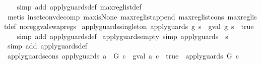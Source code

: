 \begin{isabellebody}
%
\isadelimproof
\ \ %
\endisadelimproof
%
\isatagproof
{}\isamarkupfalse%
\ {\isacharparenleft}simp\ add{\isacharcolon}\ apply{\isacharunderscore}guards{\isacharunderscore}def\ max{\isacharunderscore}reg{\isacharunderscore}list{\isacharunderscore}def{\isacharparenright}\isanewline
\ \ \isamarkupfalse%
\ {\isacharparenleft}metis\ in{\isacharunderscore}set{\isacharunderscore}conv{\isacharunderscore}decomp\ max{\isacharunderscore}is{\isacharunderscore}None\ max{\isacharunderscore}reg{\isacharunderscore}list{\isacharunderscore}append\ max{\isacharunderscore}reg{\isacharunderscore}list{\isacharunderscore}cons\ max{\isacharunderscore}reg{\isacharunderscore}list{\isacharunderscore}def\ no{\isacharunderscore}reg{\isacharunderscore}gval{\isacharunderscore}swap{\isacharunderscore}regs{\isacharparenright}%
\endisatagproof
{\isafoldproof}%
%
\isadelimproof
\isanewline
%
\endisadelimproof
\isanewline
{}\isamarkupfalse%
\ apply{\isacharunderscore}guards{\isacharunderscore}singleton{\isacharcolon}\ {\isachardoublequoteopen}{\isacharparenleft}apply{\isacharunderscore}guards\ {\isacharbrackleft}g{\isacharbrackright}\ s{\isacharparenright}\ {\isacharequal}\ {\isacharparenleft}gval\ g\ s\ {\isacharequal}\ true{\isacharparenright}{\isachardoublequoteclose}\isanewline
%
\isadelimproof
\ \ %
\endisadelimproof
%
\isatagproof
{}\isamarkupfalse%
\ {\isacharparenleft}simp\ add{\isacharcolon}\ apply{\isacharunderscore}guards{\isacharunderscore}def{\isacharparenright}%
\endisatagproof
{\isafoldproof}%
%
\isadelimproof
\isanewline
%
\endisadelimproof
\isanewline
{}\isamarkupfalse%
\ apply{\isacharunderscore}guards{\isacharunderscore}empty\ {\isacharbrackleft}simp{\isacharbrackright}{\isacharcolon}\ {\isachardoublequoteopen}apply{\isacharunderscore}guards\ {\isacharbrackleft}{\isacharbrackright}\ s{\isachardoublequoteclose}\isanewline
%
\isadelimproof
\ \ %
\endisadelimproof
%
\isatagproof
{}\isamarkupfalse%
\ {\isacharparenleft}simp\ add{\isacharcolon}\ apply{\isacharunderscore}guards{\isacharunderscore}def{\isacharparenright}%
\endisatagproof
{\isafoldproof}%
%
\isadelimproof
\isanewline
%
\endisadelimproof
\isanewline
{}\isamarkupfalse%
\ apply{\isacharunderscore}guards{\isacharunderscore}cons{\isacharcolon}\ {\isachardoublequoteopen}apply{\isacharunderscore}guards\ {\isacharparenleft}a\ {\isacharhash}\ G{\isacharparenright}\ c\ {\isacharequal}\ {\isacharparenleft}gval\ a\ c\ {\isacharequal}\ true\ {\isasymand}\ apply{\isacharunderscore}guards\ G\ c{\isacharparenright}{\isachardoublequoteclose}\isanewline

\end{isabellebody}
